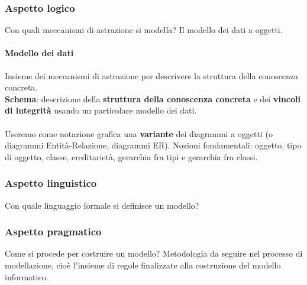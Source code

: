 \documentclass[10pt]{book}
\begin{document}
\subsubsection{Aspetto logico} Con quali meccanismi di astrazione si modella? Il modello dei dati a oggetti.
\paragraph{Modello dei dati} Insieme dei meccanismi di astrazione per descrivere la struttura della conoscenza concreta.\\
\textbf{Schema}: descrizione della \textbf{struttura della conoscenza concreta} e dei \textbf{vincoli di integrità} usando un particolare modello dei dati.\\\\
Useremo come notazione grafica una \textbf{variante} dei diagrammi a oggetti (o diagrammi Entità-Relazione, diagrammi ER). Nozioni fondamentali: oggetto, tipo di oggetto, classe, ereditarietà, gerarchia fra tipi e gerarchia fra classi.
\subsubsection{Aspetto linguistico} Con quale linguaggio formale si definisce un modello?
\subsubsection{Aspetto pragmatico} Come si procede per costruire un modello? Metodologia da seguire nel processo di modellazione, cioè l'insieme di regole finalizzate alla costruzione del modello informatico.
\end{document}

